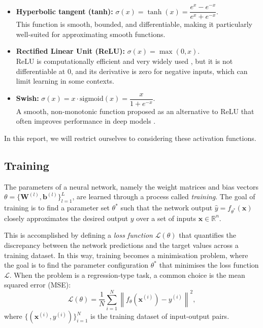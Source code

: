 \begin{itemize}
    \item \textbf{Hyperbolic tangent (tanh):} \quad 
    \( \sigma(x) = \tanh(x) = \dfrac{e^x - e^{-x}}{e^x + e^{-x}} \). \\
    This function is smooth, bounded, and differentiable, making it particularly well-suited for 
    approximating smooth functions.

    \item \textbf{Rectified Linear Unit (ReLU):} \quad 
    \( \sigma(x) = \max(0, x) \). \\
    ReLU is computationally efficient and very widely used \cite{ramachandran2017searching}, but it is
    not differentiable at 0, and its derivative is zero for negative inputs, which can limit learning 
    in some contexts.

    \item \textbf{Swish:} \quad 
    \( \sigma(x) = x \cdot \text{sigmoid}(x) = \dfrac{x}{1 + e^{-x}} \). \\
    A smooth, non-monotonic function proposed as an alternative to ReLU that often improves 
    performance in deep models \cite{ramachandran2017searching}.
\end{itemize}

In this report, we will restrict ourselves to considering these activation functions.


\subsection{Training}\label{sec:nn_training}

The parameters of a neural network, namely the weight matrices and bias vectors 
\( \theta = \{ \mathbf{W}^{(l)}, \mathbf{b}^{(l)} \}_{l=1}^L \), are learned through a process 
called \emph{training}. The goal of training is to find a parameter set $\theta^*$ such that the 
network output \( \hat{y} = f_{\theta^*}(\mathbf{x}) \) closely approximates the desired output \( y \) 
over a set of inputs \( \mathbf{x} \in \mathbb{R}^n \).

This is accomplished by defining a \emph{loss function} \( \mathcal{L}(\theta) \) that quantifies the 
discrepancy between the network predictions and the target values across a training dataset. 
In this way, training becomes a minimisation problem, where the goal is to find the parameter 
configuration $\theta^*$ that minimises the loss function $\mathcal{L}$.
When the problem is a regression-type task, a common choice is the mean squared error (MSE):
\[
    \mathcal{L}(\theta) = \frac{1}{N} \sum_{i=1}^{N} \left\| f_\theta(\mathbf{x}^{(i)}) - y^{(i)} \right\|^2,
\]
where \( \{ (\mathbf{x}^{(i)}, y^{(i)}) \}_{i=1}^N \) is the training dataset of input-output pairs.

